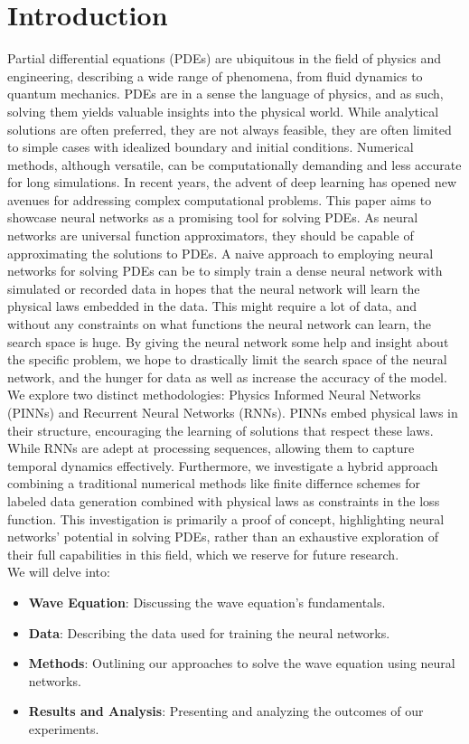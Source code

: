 \documentclass[twoside,11pt]{report}
\begin{document}
\section*{Introduction}

    Partial differential equations (PDEs) are ubiquitous in the field of physics and engineering,
    describing a wide range of phenomena, from fluid dynamics to quantum mechanics.
    PDEs are in a sense the language of physics, and as such, solving them yields valuable insights into
    the physical world. While analytical solutions are often preferred, they are not always feasible,
    they are often limited to simple cases with idealized boundary and initial conditions. Numerical methods, 
    although versatile, can be computationally 
    demanding and less accurate for long simulations. 
    In recent years, the advent 
    of deep learning has opened new avenues for addressing complex computational problems.
    This paper aims to showcase neural networks as a promising tool for solving PDEs. As 
    neural networks are universal function approximators, they should be 
    capable of approximating the solutions to PDEs. 
    A naive approach to employing neural networks for solving
    PDEs can be to simply train a dense neural network with simulated or recorded data in hopes that
    the neural network will learn the physical laws embedded in the data. This might require a lot of data,
    and without any constraints on what functions the neural network can learn, the search space is huge.
    By giving the neural network some help and insight about the specific
    problem, we hope to drastically limit the search space of the neural network, and the hunger for data
    as well as increase the accuracy of the model.
    We explore two distinct 
    methodologies: Physics Informed Neural Networks (PINNs) and Recurrent Neural Networks (RNNs). 
    PINNs embed physical laws in their structure, encouraging the learning of solutions that respect
    these laws. While RNNs are 
    adept at processing sequences, allowing them to capture temporal dynamics effectively. Furthermore, 
    we investigate a hybrid approach combining a traditional numerical methods like finite
    differnce schemes for labeled data generation combined with physical laws as constraints in the loss function.
    This investigation is primarily a proof of concept, highlighting neural networks' potential 
    in solving PDEs, rather than an exhaustive exploration of their full capabilities in this field, 
    which we reserve for future research.\\
    We will delve into:
    \begin{itemize}
    \item \textbf{Wave Equation}: Discussing the wave equation's fundamentals.
    \item \textbf{Data}: Describing the data used for training the neural networks.
    \item \textbf{Methods}: Outlining our approaches to solve the wave equation using neural networks.
    \item \textbf{Results and Analysis}: Presenting and analyzing the outcomes of our experiments.
    \end{itemize}
\end{document}

